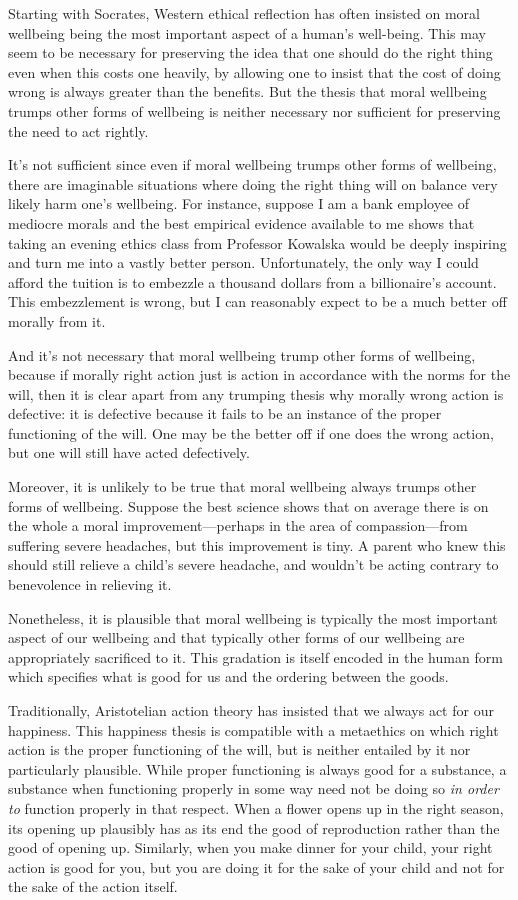 Starting with Socrates, Western ethical reflection has often insisted on moral wellbeing being the most important aspect of a human's
well-being. This may seem to be necessary for preserving the idea that one should do the right thing even when this costs one heavily,
by allowing one to insist that the cost of doing wrong is always greater than the benefits. But the thesis that moral wellbeing trumps
other forms of wellbeing is neither necessary nor sufficient for preserving the need to act rightly.

It's not sufficient since even if moral wellbeing trumps other forms of wellbeing, there are imaginable situations where doing the right thing will on balance
very likely harm one's wellbeing. For instance, suppose I am a bank employee of mediocre morals and the best empirical evidence available to
me shows that taking an evening ethics class from Professor Kowalska  would be deeply inspiring and turn me into a vastly better person.
Unfortunately, the only way I could afford the tuition is to embezzle a thousand dollars from a billionaire's account. This embezzlement is
wrong, but I can reasonably expect to be a much better off morally from it.

And it's not necessary that moral wellbeing trump other forms of wellbeing, because if morally right action just is action in accordance with
the norms for the will, then it is clear apart from any trumping thesis why morally wrong action is defective: it is defective because it
fails to be an instance of the proper functioning of the will. One may be the better off if one does the wrong action, but one will still
have acted defectively.

Moreover, it is unlikely to be true that moral wellbeing always trumps other forms of wellbeing. Suppose the best science shows that on average
there is on the whole a moral improvement---perhaps in the area of compassion---from suffering severe headaches, but this improvement is tiny.
A parent who knew this should still relieve a child's severe headache, and wouldn't be acting contrary to benevolence in relieving it.

Nonetheless, it is plausible that moral wellbeing is typically the most important aspect of our wellbeing and that typically other forms
of our wellbeing are appropriately sacrificed to it. This gradation is itself encoded in the human form which specifies what is good for
us and the ordering between the goods.

Traditionally, Aristotelian action theory has insisted that we always act for our happiness. This happiness thesis is compatible with a metaethics on
which right action is the proper functioning of the will, but is neither entailed by it nor particularly plausible. While proper functioning is always
good for a substance, a substance when functioning properly in some way need not be doing so \textit{in order to} function properly in that respect.
When a flower opens up in the right season, its opening up plausibly has as its end the good of reproduction rather than the good of opening up.
Similarly, when you make dinner for your child, your right action is good for you, but you are doing it for the sake of your child and not for
the sake of the action itself.

